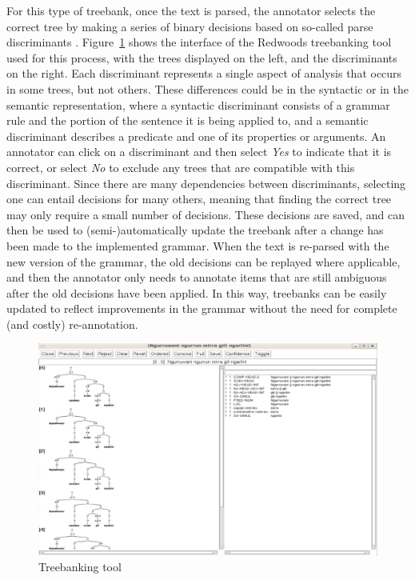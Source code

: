 \documentclass[12pt]{article}
\begin{document}
For this type of treebank, once the text is parsed, the annotator selects the
correct tree by making a series of binary decisions based on so-called parse
discriminants \cite{Carter:99}.  
Figure~\ref{fig:tsdb} shows the interface of
the Redwoods treebanking tool used for this
process, with the trees displayed on the left, and the discriminants on the
right. Each discriminant represents a single aspect of analysis that occurs in
some trees, but not others. These differences could be in the syntactic or in
the semantic representation, where a syntactic discriminant consists of a
grammar rule and the portion of the sentence it is being applied to, and a
semantic discriminant describes a predicate and one of its properties or
arguments. An annotator can click on a discriminant and then select \textit{Yes}
to indicate that it is correct, or select \textit{No} to exclude any trees that
are compatible with this discriminant. Since there are many dependencies between
discriminants, selecting one can entail decisions for many others, meaning
that finding the correct tree may only require a small number of decisions.
These decisions are saved, and can then be used to (semi-)automatically update
the treebank after a change has been made to the implemented grammar. When the
text is re-parsed with the new version of the grammar, the old decisions can be
replayed where applicable, and then the annotator only needs to annotate items
that are still ambiguous after the old decisions have been applied.  In this
way, treebanks can be easily updated to reflect improvements in the grammar
without the need for complete (and costly) re-annotation.

\begin{figure}
\centering
\includegraphics[width=6in]{treebanker}
\caption{Treebanking tool}
\label{fig:tsdb}
\end{figure}
\end{document}
